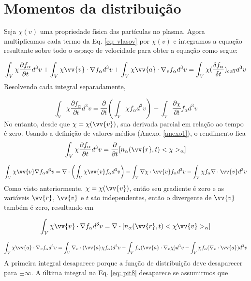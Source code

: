 \documentclass[12pt,oneside,a4paper]{abntex2}
\begin{document}
\chapter{Momentos da distribuição}
 Seja $\chi(v)$ uma propriedade física das partículas no plasma. Agora multiplicamos cada termo da Eq. \ref{eq: vlasov} por $\chi(v)$ e integramos a equação resultante sobre todo o espaço de velocidade para obter a equação como segue:

\begin{equation}
\label{eq: pit3}
\int_V \chi \frac{\partial f_\alpha}{\partial t} d^3 v + \int_V \chi \vv{v} \cdot \nabla f_\alpha d^3 v + \int_V \chi \vv{a} \cdot \nabla_v f_\alpha d^3 v = \int_V \chi (\frac{\delta f_\alpha}{\delta t})_{coll} d^3 v
\end{equation}
Resolvendo cada integral separadamente,

\begin{equation}
\label{eq: pit4}
\int_V \chi \frac{\partial f_\alpha}{\partial t} d^3 v  = \frac{\partial }{\partial t} (\int_V \chi f_\alpha d^3 v)-\int_V \frac{\partial \chi}{\partial t} f_\alpha d^3 v
\end{equation}
No entanto, desde que $\chi = \chi(\vv{v})$, sua derivada parcial em relação ao tempo é zero. Usando a definição de valores médios (Anexo. \ref{anexo1}), o rendimento fica
\begin{equation}
\label{eq: pit5}
\int_V \chi \frac{\partial f_\alpha}{\partial t} d^3 v = \frac{\partial}{\partial t} [n_\alpha(\vv{r},t)<\chi>_\alpha]
\end{equation}

\begin{equation}
\label{eq: pit6}
\int_V \chi \vv{v} \nabla f_\alpha d^3 v = \nabla \cdot \left( \int_V \chi \vv{v} f_\alpha d^3 v \right) - \int_V \nabla \chi \cdot \vv{v} f_\alpha d^3 v - \int_V \chi  f_\alpha \nabla \cdot \vv{v}  d^3 v
\end{equation}
Como visto anteriormente, $\chi = \chi(\vv{v})$, então seu gradiente é zero e as variáveis $\vv{r}$, $\vv{v}$ e $t$ são independentes, então o divergente de $\vv{v}$ também é zero, resultando em

\begin{equation}
\label{eq: pit7}
\int_V \chi \vv{v} \cdot \nabla f_\alpha d^3 v = \nabla \cdot [n_\alpha(\vv{r},t)<\chi \vv{v}>_\alpha]
\end{equation}

\begin{equation}
\label{eq: pit8}
\int_V \chi \vv{a} \cdot \nabla_v f_\alpha d^3 v = \int_V \nabla_v \cdot (\vv{a} \chi f_\alpha)d^3 v - \int_V f_\alpha (\vv{a} \cdot \nabla_v \chi) d^3 v - \int_V \chi  f_\alpha (\nabla_v \cdot \vv{a})  d^3 v
\end{equation}
A primeira integral desaparece porque a função de distribuição deve desaparecer para $\pm \infty$. A última integral na Eq. \ref{eq: pit8} desaparece se assumirmos que
\end{document}
